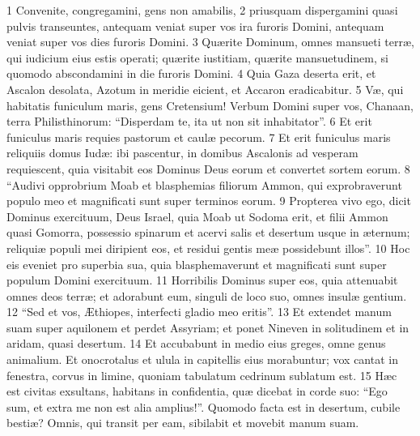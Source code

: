 1 Convenite, congregamini, gens non amabilis, 2 priusquam dispergamini quasi pulvis transeuntes, antequam veniat super vos ira furoris Domini, antequam veniat super vos dies furoris Domini. 3 Quærite Dominum, omnes mansueti terræ, qui iudicium eius estis operati; quærite iustitiam, quærite mansuetudinem, si quomodo abscondamini in die furoris Domini. 4 Quia Gaza deserta erit, et Ascalon desolata, Azotum in meridie eicient, et Accaron eradicabitur. 5 Væ, qui habitatis funiculum maris, gens Cretensium! Verbum Domini super vos, Chanaan, terra Philisthinorum: “Disperdam te, ita ut non sit inhabitator”. 6 Et erit funiculus maris requies pastorum et caulæ pecorum. 7 Et erit funiculus maris reliquiis domus Iudæ: ibi pascentur, in domibus Ascalonis ad vesperam requiescent, quia visitabit eos Dominus Deus eorum et convertet sortem eorum. 8 “Audivi opprobrium Moab et blasphemias filiorum Ammon, qui exprobraverunt populo meo et magnificati sunt super terminos eorum. 9 Propterea vivo ego, dicit Dominus exercituum, Deus Israel, quia Moab ut Sodoma erit, et filii Ammon quasi Gomorra, possessio spinarum et acervi salis et desertum usque in æternum; reliquiæ populi mei diripient eos, et residui gentis meæ possidebunt illos”. 10 Hoc eis eveniet pro superbia sua, quia blasphemaverunt et magnificati sunt super populum Domini exercituum. 11 Horribilis Dominus super eos, quia attenuabit omnes deos terræ; et adorabunt eum, singuli de loco suo, omnes insulæ gentium. 12 “Sed et vos, Æthiopes, interfecti gladio meo eritis”. 13 Et extendet manum suam super aquilonem et perdet Assyriam; et ponet Nineven in solitudinem et in aridam, quasi desertum. 14 Et accubabunt in medio eius greges, omne genus animalium. Et onocrotalus et ulula in capitellis eius morabuntur; vox cantat in fenestra, corvus in limine, quoniam tabulatum cedrinum sublatum est. 15 Hæc est civitas exsultans, habitans in confidentia, quæ dicebat in corde suo: “Ego sum, et extra me non est alia amplius!”. Quomodo facta est in desertum, cubile bestiæ? Omnis, qui transit per eam, sibilabit et movebit manum suam.

\ifcontext{\stoplinenumbering}